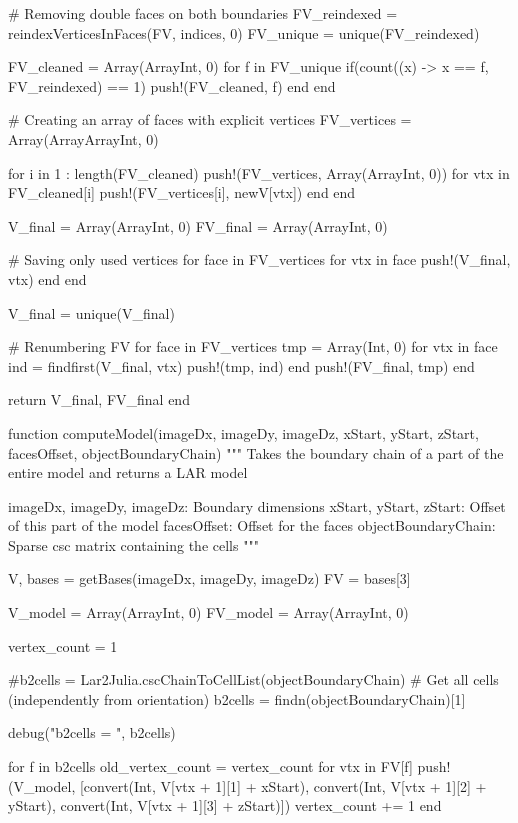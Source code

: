 \documentclass[11pt,oneside]{article}	%
\begin{document}
{  # Removing double faces on both boundaries
  FV_reindexed = reindexVerticesInFaces(FV, indices, 0)
  FV_unique = unique(FV_reindexed)

  FV_cleaned = Array(Array{Int}, 0)
  for f in FV_unique
    if(count((x) -> x == f, FV_reindexed) == 1)
      push!(FV_cleaned, f)
    end
  end

  # Creating an array of faces with explicit vertices
  FV_vertices = Array(Array{Array{Int}}, 0)

  for i in 1 : length(FV_cleaned)
    push!(FV_vertices, Array(Array{Int}, 0))
    for vtx in FV_cleaned[i]
      push!(FV_vertices[i], newV[vtx])
    end
  end

  V_final = Array(Array{Int}, 0)
  FV_final = Array(Array{Int}, 0)

  # Saving only used vertices
  for face in FV_vertices
    for vtx in face
      push!(V_final, vtx)
    end
  end

  V_final = unique(V_final)

  # Renumbering FV
  for face in FV_vertices
    tmp = Array(Int, 0)
    for vtx in face
      ind = findfirst(V_final, vtx)
      push!(tmp, ind)
    end
    push!(FV_final, tmp)
  end

  return V_final, FV_final
end

function computeModel(imageDx, imageDy, imageDz,
                      xStart, yStart, zStart,
                      facesOffset, objectBoundaryChain)
  """
  Takes the boundary chain of a part of the entire model
  and returns a LAR model

  imageDx, imageDy, imageDz: Boundary dimensions
  xStart, yStart, zStart: Offset of this part of the model
  facesOffset: Offset for the faces
  objectBoundaryChain: Sparse csc matrix containing the cells
  """

  V, bases = getBases(imageDx, imageDy, imageDz)
  FV = bases[3]

  V_model = Array(Array{Int}, 0)
  FV_model = Array(Array{Int}, 0)

  vertex_count = 1

  #b2cells = Lar2Julia.cscChainToCellList(objectBoundaryChain)
  # Get all cells (independently from orientation)
  b2cells = findn(objectBoundaryChain)[1]

  debug("b2cells = ", b2cells)

  for f in b2cells
    old_vertex_count = vertex_count
    for vtx in FV[f]
      push!(V_model, [convert(Int, V[vtx + 1][1] + xStart),
                    convert(Int, V[vtx + 1][2] + yStart),
                    convert(Int, V[vtx + 1][3] + zStart)])
      vertex_count += 1
    end

}
\end{document}
